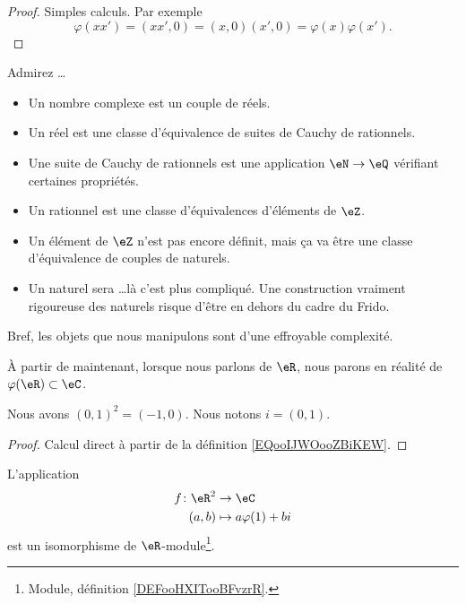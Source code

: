 \begin{proof}
    Simples calculs. Par exemple
    \begin{equation}
        \varphi(xx')=(xx',0)=(x,0)(x',0)=\varphi(x)\varphi(x').
    \end{equation}
\end{proof}

\begin{normaltext}
    Admirez \ldots
    \begin{itemize}
        \item Un nombre complexe est un couple de réels.
        \item Un réel est une classe d'équivalence de suites de Cauchy de rationnels.
        \item Une suite de Cauchy de rationnels est une application \( \eN\to \eQ\) vérifiant certaines propriétés.
        \item Un rationnel est une classe d'équivalences d'éléments de \( \eZ\).
        \item Un élément de \( \eZ\) n'est pas encore définit, mais ça va être une classe d'équivalence de couples de naturels.
        \item Un naturel sera \ldots là c'est plus compliqué. Une construction vraiment rigoureuse des naturels risque d'être en dehors du cadre du Frido.
    \end{itemize}
    Bref, les objets que nous manipulons sont d'une effroyable complexité. 
\end{normaltext}

\begin{normaltext}
    À partir de maintenant, lorsque nous parlons de \( \eR\), nous parons en réalité de \( \varphi(\eR)\subset \eC\).
\end{normaltext}

\begin{lemma}
    Nous avons \( (0,1)^2=(-1,0)\). Nous notons \( i=(0,1)\).
\end{lemma}

\begin{proof}
    Calcul direct à partir de la définition \ref{EQooIJWOooZBiKEW}.
\end{proof}

\begin{proposition}     \label{PROPooKQHLooMFxNLe}
    L'application
    \begin{equation}
        \begin{aligned}
            f\colon \eR^2&\to \eC \\
            (a,b)&\mapsto a\varphi(1)+bi
        \end{aligned}
    \end{equation}
    est un isomorphisme de \( \eR\)-module\footnote{Module, définition \ref{DEFooHXITooBFvzrR}.}.
\end{proposition}


